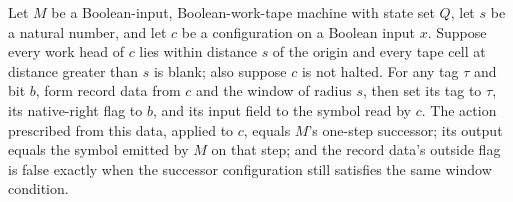 \begin{theorem}
\label{Turing.recordStep_observed_action}
\leanok
{}
Let $M$ be a Boolean-input, Boolean-work-tape machine with state set $Q$, let $s$ be a
natural number, and let $c$ be a configuration on a Boolean input $x$. Suppose every
work head of $c$ lies within distance $s$ of the origin and every tape cell at distance
greater than $s$ is blank; also suppose $c$ is not halted. For any tag $\tau$ and bit
$b$, form record data from $c$ and the window of radius $s$, then set its tag to $\tau$,
its native-right flag to $b$, and its input field to the symbol read by $c$. The action
prescribed from this data, applied to $c$, equals $M$'s one-step successor; its output
equals the symbol emitted by $M$ on that step; and the record data's outside flag is
false exactly when the successor configuration still satisfies the same window
condition.
\end{theorem}

